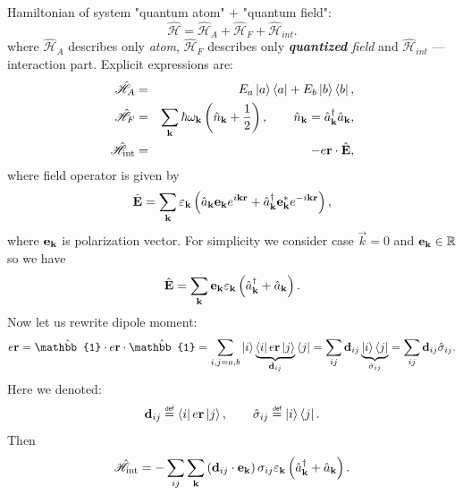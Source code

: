 Hamiltonian of system "quantum atom" $+$ "quantum field":
\begin{equation}
	\hat{\mathscr{H}} = \hat{\mathscr{H}}_A + \hat{\mathscr{H}}_F + \hat{\mathscr{H}}_{int}.
\end{equation}
where $\hat{\mathscr{H}}_A$ describes only \textit{atom}, $\hat{\mathscr{H}}_F$ describes only \textit{\textbf{quantized} field} and $\hat{\mathscr{H}}_{int}$ --- interaction part. Explicit expressions are:
\begin{eqnarray}
	\hat{\mathscr{H}}_A &=& E_a \left\lvert {a} \right\rangle \left\langle {a} \right\rvert + E_b \left\lvert {b} \right\rangle \left\langle {b} \right\rvert, \\
	\hat{\mathscr{H}}_F &=& \sum_{\mathbf{k}} \hbar \omega_{\mathbf{k}} \left( \hat{n}_{\mathbf{k}} + \frac{1}{2} \right), \qquad \hat{n}_{\mathbf{k}} = \hat{a}^{\dagger}_{\mathbf{k}} \hat{a}_{\mathbf{k}}, \\
	\hat{\mathscr{H}}_{\text{int}} &=& -e \mathbf{r} \cdot \hat{\mathbf{E}},
\end{eqnarray}
where field operator is given by
\begin{equation}
	\hat{\mathbf{E}} = \sum_{\mathbf{k}} \varepsilon_{\mathbf{k}} \left( \hat{a}_{\mathbf{k}} \mathbf{e}_{\mathbf{k}} e^{i \mathbf{k} \mathbf{r}} + \hat{a}^{\dagger}_{\mathbf{k}} \mathbf{e}^*_{\mathbf{k}} e^{-i \mathbf{k} \mathbf{r}} \right),
\end{equation}
where $\mathbf{e}_{\mathbf{k}}$ is polarization vector. For simplicity we consider case $\vec{k} = 0$ and $\mathbf{e}_{\mathbf{k}} \in \mathbb{R}$ so we have
\begin{equation}
	\hat{\mathbf{E}} = \sum_{\mathbf{k}} \mathbf{e}_{\mathbf{k}} \varepsilon_{\mathbf{k}} \left( \hat{a}^{\dagger}_{\mathbf{k}} + \hat{a}_{\mathbf{k}} \right).
\end{equation}
Now let us rewrite dipole moment:
\begin{equation}
	e \vec{r} = \hat{\mathbb{1}} \cdot e \vec{r} \cdot \hat{\mathbb{1}} = \sum_{i,j = a,b} \ket{i} \underbrace{\bra{i}  e \vec{r} \ket{j}}_{\vec{d}_{ij}} \bra{j} = \sum_{ij} \vec{d}_{ij} \underbrace{\ket{i} \bra{j}}_{\hat{\sigma}_{ij}} = \sum_{ij} \vec{d}_{ij} \hat{\sigma}_{ij}.
\end{equation}
Here we denoted:
\begin{equation}
	\vec{d}_{ij} \myeq \bra{i}  e \vec{r} \ket{j}, \qquad \hat{\sigma}_{ij} \myeq  \ket{i} \bra{j}.
\end{equation}
Then 
\begin{equation}
	\hat{\mathscr{H}}_{\text{int}} = - \sum_{ij} \sum_{\mathbf{k}} \left(\mathbf{d}_{ij} \cdot \mathbf{e}_{\mathbf{k}}\right) \sigma_{ij} \varepsilon_{\mathbf{k}} \left( \hat{a}^{\dagger}_{\mathbf{k}} + \hat{a}_{\mathbf{k}} \right).
\end{equation}
